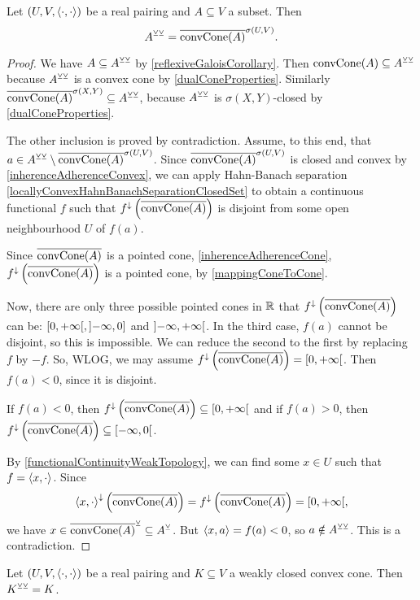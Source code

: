 \begin{proposition}
Let $\sSet{U,V,\pair{\cdot,\cdot}}$ be a real pairing and $A\subseteq V$ a subset. Then
\[ A^{\veebar\veebar} = \overline{\operatorname{convCone}(A)}^{\sigma(U,V)}. \]
\end{proposition}
\begin{proof}
We have $A \subseteq A^{\veebar\veebar}$ by \ref{reflexiveGaloisCorollary}. Then $\operatorname{convCone}(A) \subseteq A^{\veebar\veebar}$ because $A^{\veebar\veebar}$ is a convex cone by \ref{dualConeProperties}. Similarly $\overline{\operatorname{convCone}(A)}^{\sigma(X,Y)} \subseteq A^{\veebar\veebar}$, because $A^{\veebar\veebar}$ is $\sigma(X,Y)$-closed by \ref{dualConeProperties}.

The other inclusion is proved by contradiction. Assume, to this end, that $a\in A^{\veebar\veebar} \setminus \overline{\operatorname{convCone}(A)}^{\sigma(U,V)}$. Since $\overline{\operatorname{convCone}(A)}^{\sigma(U,V)}$ is closed and convex by \ref{inherenceAdherenceConvex}, we can apply Hahn-Banach separation \ref{locallyConvexHahnBanachSeparationClosedSet} to obtain a continuous functional $f$ such that $f^\downarrow\left(\overline{\operatorname{convCone}(A)}\right)$ is disjoint from some open neighbourhood $U$ of $f(a)$.

Since $\overline{\operatorname{convCone}(A)}$ is a pointed cone, \ref{inherenceAdherenceCone}, $f^\downarrow\left(\overline{\operatorname{convCone}(A)}\right)$ is a pointed cone, by \ref{mappingConeToCone}.

Now, there are only three possible pointed cones in $\mathbb{R}$ that $f^\downarrow\left(\overline{\operatorname{convCone}(A)}\right)$ can be: $\interval[co]{0, +\infty}, \interval[oc]{-\infty, 0}$ and $\interval[o]{-\infty, +\infty}$. In the third case, $f(a)$ cannot be disjoint, so this is impossible. We can reduce the second to the first by replacing $f$ by $-f$. So, WLOG, we may assume $f^\imf\left(\overline{\convCone(A)}\right) = \interval[co]{0, +\infty}$. Then $f(a) < 0$, since it is disjoint.

If $f(a) < 0$, then $f^\imf\left(\overline{\convCone(A)}\right)\subseteq \interval[co]{0,+\infty}$ and if $f(a) > 0$, then $f^\imf\left(\overline{\convCone(A)}\right)\subseteq \interval[co]{-\infty, 0}$.

By \ref{functionalContinuityWeakTopology}, we can find some $x\in U$ such that $f = \left\langle x,\cdot \right\rangle$. Since
\[ \pair{x,\cdot}^\imf\left(\overline{\convCone(A)}\right) = f^\imf\left(\overline{\convCone(A)}\right) = \interval[co]{0, +\infty}, \]
we have $x\in \overline{\operatorname{convCone}(A)}^\veebar \subseteq A^\veebar$. But $\left\langle x, a \right\rangle = f(a) < 0$, so $a\notin A^{\veebar\veebar}$. This is a contradiction.
\end{proof}
\begin{corollary}
Let $\sSet{U,V,\pair{\cdot,\cdot}}$ be a real pairing and $K\subseteq V$ a weakly closed convex cone. Then $K^{\veebar\veebar} = K$.
\end{corollary}


